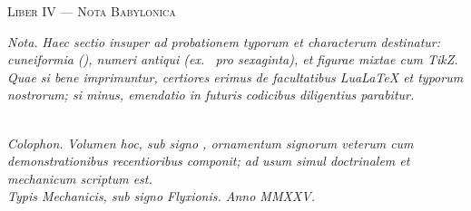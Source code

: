 \documentclass[12pt]{article}
\newcommand{\dingir}{\centerline{\Large \ornament{𒀭}}}
\newcommand{\divider}{\vspace{1em}\dingir\vspace{1em}}
\newcommand{\Liber}[1]{\vspace{1ex}\begin{center}\Large\textsc{Liber #1}\end{center}\vspace{-0.5ex}\dingir\vspace{0.5ex}}
\begin{document}
\Liber{IV — Nota Babylonica}

\textit{Nota.} \; \textit{Haec sectio insuper ad probationem typorum et characterum destinatur: cuneiformia (), numeri antiqui (ex.\  pro sexaginta), et figurae mixtae cum TikZ. Quae si bene imprimuntur, certiores erimus de facultatibus Lua\LaTeX{} et typorum nostrorum; si minus, emendatio in futuris codicibus diligentius parabitur.}

\divider

\begin{center}
\dingir\\[0.5em]
\textit{Colophon.} \;
\textit{Volumen hoc, sub signo , ornamentum signorum veterum cum demonstrationibus recentioribus componit; ad usum simul doctrinalem et mechanicum scriptum est.}\\[0.25em]
\textit{Typis Mechanicis, sub signo Flyxionis. \; Anno MMXXV.}
\end{center}
\end{document}
